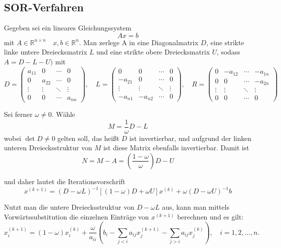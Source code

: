\documentclass{scrartcl}
\begin{document}
\subsection{SOR-Verfahren}
Gegeben sei ein lineares Gleichungssystem
\[Ax = b\]
mit \(A \in \mathbb{R}^{n \times n} \quad x,b \in \mathbb{R}^n\). Man zerlege
  A in eine Diagonalmatrix \(D\), eine strikte linke untere Dreiecksmatrix
  \(L\) und eine strikte obere Dreiecksmatrix \(U\), sodass \(A = D -L-U)\) mit
\[
    D = \begin{pmatrix}
        a_{11} & 0      & \cdots & 0      \\
        0      & a_{22} & \cdots & 0      \\
        \vdots & \vdots & \ddots & \vdots \\
        0      & 0      & \cdots & a_{nn}
    \end{pmatrix}, \quad
    L = \begin{pmatrix}
        0       & 0       & \cdots & 0      \\
        -a_{21} & 0       & \cdots & 0      \\
        \vdots  & \vdots  & \ddots & \vdots \\
        -a_{n1} & -a_{n2} & \cdots & 0
    \end{pmatrix}, \quad
    R = \begin{pmatrix}
        0      & -a_{12} & \cdots & -a_{1n} \\
        0      & 0       & \cdots & -a_{2n} \\
        \vdots & \vdots  & \ddots & \vdots  \\
        0      & 0       & \cdots & 0
    \end{pmatrix}
\]

Sei ferner \(\omega \neq 0\). Wähle \[M = \frac{1}{\omega}D-L\]
wobei \(\operatorname{det}D \neq 0\) gelten soll, das heißt \(D\) ist
  invertierbar, und aufgrund der linken unteren Dreiecksstruktur von \(M\) ist
  diese Matrix ebenfalls invertierbar. Damit ist \[N= M-A=(\frac{1-\omega}{\omega})D-U\]

und daher lautet die Iterationsvorschrift
\[x^{(k+1)}=(D - \omega L)^{-1}[(1- \omega)D + \omega U]x^{(k)} + \omega (D-\omega U)^{-1}b\]

Nutzt man die untere Dreiecksstruktur von \(D - \omega L\) aus, kann man
mittels Vorwärtssubstitution die einzelnen Einträge von \(x^{(k+1)}\) berechnen
und es gilt:
\[
    x_i^{(k+1)} = (1 - \omega) x_i^{(k)} + \frac{\omega}{a_{ii}}
    \left( b_i - \sum_{j < i} a_{ij} x_j^{(k+1)} - \sum_{j > i} a_{ij} x_j^{(k)} \right),
    \quad i = 1, 2, \ldots, n.
\]\cite{SOR}
\end{document}
